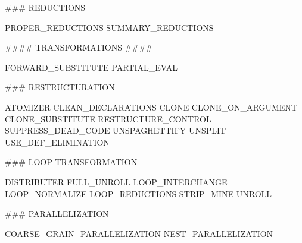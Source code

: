 \documentclass[a4paper,12pt]{article}
\begin{document}
\begin{verbatim*}
### REDUCTIONS

PROPER_REDUCTIONS
SUMMARY_REDUCTIONS


#### TRANSFORMATIONS #### 

FORWARD_SUBSTITUTE            
PARTIAL_EVAL 

### RESTRUCTURATION 

ATOMIZER  
CLEAN_DECLARATIONS  
CLONE  
CLONE_ON_ARGUMENT  
CLONE_SUBSTITUTE  
RESTRUCTURE_CONTROL
SUPPRESS_DEAD_CODE
UNSPAGHETTIFY
UNSPLIT
USE_DEF_ELIMINATION

### LOOP TRANSFORMATION

DISTRIBUTER  
FULL_UNROLL 
LOOP_INTERCHANGE  
LOOP_NORMALIZE  
LOOP_REDUCTIONS  
STRIP_MINE
UNROLL

### PARALLELIZATION

COARSE_GRAIN_PARALLELIZATION  
NEST_PARALLELIZATION 
\end{verbatim*}
\end{document}
